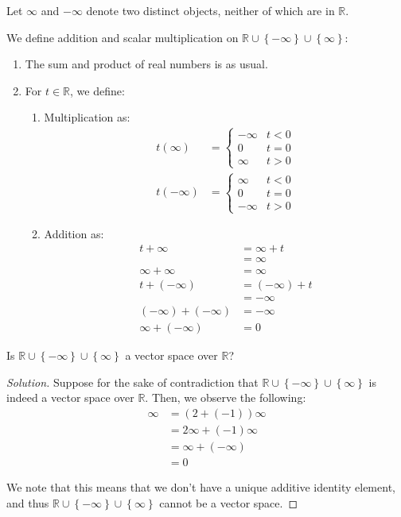 \documentclass[openany]{book}
\newenvironment{solution}{\begin{proof}[Solution]}{\end{proof}}
\newcommand{\RR}{\mathbb{R}}
\begin{document}
	\begin{hw}
		Let $\infty$ and $-\infty$ denote two distinct objects, neither of which are in $\RR$. 
		
		We define addition and scalar multiplication on $\RR \cup \left\{  -\infty \right\} \cup \left\{  \infty \right\}$:
		\begin{enumerate}
			\item The sum and product of real numbers is as usual.
			\item For $t \in \RR$, we define:
			\begin{enumerate}
				\item Multiplication as:
				\begin{align*}
					t (\infty) &= 
					\begin{cases}
						- \infty & t < 0 \\
						0 & t = 0 \\
						\infty & t > 0
					\end{cases} \\
					t (-\infty) &= 
					\begin{cases}
						\infty & t < 0 \\
						0 & t = 0 \\
						-\infty & t > 0
					\end{cases}
				\end{align*}
			
				\item Addition as:
				\begin{align*}
					t + \infty &= \infty + t \\
					 &= \infty \\
					 \infty + \infty &= \infty \\
					 t + (-\infty) &= (-\infty) + t \\
					 &= -\infty \\
					 (-\infty) + (-\infty) &= -\infty \\
					 \infty + (-\infty) &= 0
				\end{align*}
			\end{enumerate}
		\end{enumerate}
	
		Is $\RR \cup \left\{  -\infty \right\} \cup \left\{  \infty \right\}$ a vector space over $\RR$?
	\end{hw}
	\begin{solution}
		Suppose for the sake of contradiction that $\RR \cup \left\{  -\infty \right\} \cup \left\{  \infty \right\}$ is indeed a vector space over $\RR$. Then, we observe the following:
		\begin{align*}
			\infty &= (2 + (-1))\infty \\
			&= 2\infty  + (- 1)\infty \\
			&= \infty + (-\infty) \\
			&= 0
		\end{align*}
	
		We note that this means that we don't have a unique additive identity element, and thus $\RR \cup \left\{  -\infty \right\} \cup \left\{  \infty \right\}$ cannot be a vector space.
	\end{solution}
\end{document}
